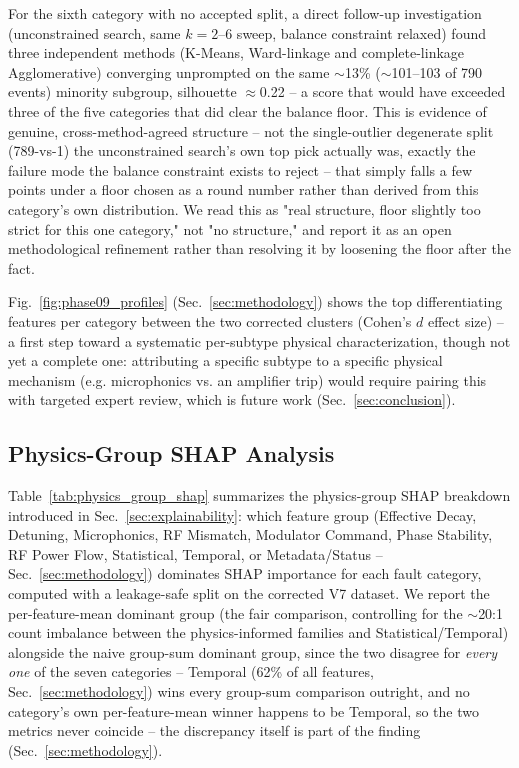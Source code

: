 For the sixth category with no accepted split, a direct follow-up investigation (unconstrained search, same $k=2$--6 sweep, balance constraint relaxed) found three independent methods (K-Means, Ward-linkage and complete-linkage Agglomerative) converging unprompted on the same $\sim$13\% ($\sim$101--103 of 790 events) minority subgroup, silhouette $\approx$0.22 -- a score that would have exceeded three of the five categories that did clear the balance floor. %
This is evidence of genuine, cross-method-agreed structure -- not the single-outlier degenerate split (789-vs-1) the unconstrained search's own top pick actually was, exactly the failure mode the balance constraint exists to reject -- that simply falls a few points under a floor chosen as a round number rather than derived from this category's own distribution. We read this as "real structure, floor slightly too strict for this one category," not "no structure," and report it as an open methodological refinement rather than resolving it by loosening the floor after the fact.

Fig.~\ref{fig:phase09_profiles} (Sec.~\ref{sec:methodology}) shows the top differentiating features per category between the two corrected clusters (Cohen's $d$ effect size) -- a first step toward a systematic per-subtype physical characterization, though not yet a complete one: attributing a specific subtype to a specific physical mechanism (e.g. microphonics vs. an amplifier trip) would require pairing this with targeted expert review, which is future work (Sec.~\ref{sec:conclusion}).

\subsection{Physics-Group SHAP Analysis}

Table~\ref{tab:physics_group_shap} summarizes the physics-group SHAP breakdown introduced in Sec.~\ref{sec:explainability}: which feature group (Effective Decay, Detuning, Microphonics, RF Mismatch, Modulator Command, Phase Stability, RF Power Flow, Statistical, Temporal, or Metadata/Status -- Sec.~\ref{sec:methodology}) dominates SHAP importance for each fault category, computed with a leakage-safe split on the corrected V7 dataset. We report the per-feature-mean dominant group (the fair comparison, controlling for the $\sim$20:1 %
count imbalance between the physics-informed families and Statistical/Temporal) alongside the naive group-sum dominant group, since the two disagree for \emph{every one} of the seven categories -- Temporal (62\% of all features, Sec.~\ref{sec:methodology}) wins every group-sum comparison outright, and no category's own per-feature-mean winner happens to be Temporal, so the two metrics never coincide -- the discrepancy itself is part of the finding (Sec.~\ref{sec:methodology}).

